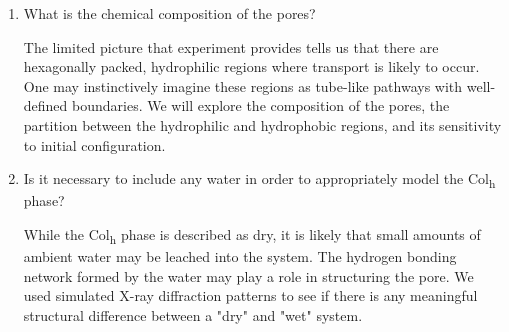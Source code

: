 \documentclass[journal=jpcbfk,manusciprt=article]{achemso}
\begin{document}
\begin{enumerate}

	\item What is the chemical composition of the pores?\label{point:composition}

	The limited picture that experiment provides tells us that there are hexagonally packed, 
	hydrophilic regions where transport is likely to occur. One may instinctively imagine these 
	regions as tube-like pathways with well-defined boundaries. We will explore the composition
	of the pores, the partition between the hydrophilic and hydrophobic regions, and its 
	sensitivity to initial configuration. 
	
    \item Is it necessary to include any water in order to appropriately model the 
    Col\textsubscript{h} phase? \label{point:water}

	While the Col\textsubscript{h} phase is described as dry, it is likely that small amounts of
	ambient water may be leached into the system. The hydrogen bonding network formed by the 
	water may play a role in structuring the pore. We used simulated X-ray diffraction patterns
	to see if there is any meaningful structural difference between a "dry" and "wet" system.

  \end{enumerate}
  
%
\end{document}
